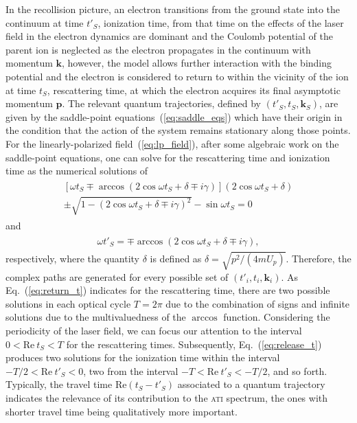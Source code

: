 In the recollision picture, an electron transitions from the ground
state into the continuum at time $t'_{S}$, ionization time, from that
time on the effects of the laser field in the electron dynamics are
dominant and the Coulomb potential of the parent ion is neglected as
the electron propagates in the continuum with momentum $\mathbf{k}$,
however, the model allows further interaction with the binding
potential and the electron is considered to return to within the
vicinity of the ion at time $t_{S}$, rescattering time, at which the
electron acquires its final asymptotic momentum $\mathbf{p}$. The
relevant quantum trajectories, defined by $(t'_{S}, t_{S},
\mathbf{k}_{S})$, are given by the saddle-point
equations~(\ref{eq:saddle_eqs}) which have their origin in the
condition that the action of the system remains stationary along those
points. For the linearly-polarized field~(\ref{eq:lp_field}), after
some algebraic work on the saddle-point equations, one can solve for
the rescattering time and ionization time as the numerical solutions
of~\cite{KopoldOptComm2000}
%
\begin{eqnarray}
  \label{eq:return_t}
  \begin{split}
    [\omega t_{S} \mp \arccos(2\cos\omega t_{S} + \delta \mp i\gamma)]
    (2\cos\omega t_{S} + \delta) \\
    \pm \sqrt{1 - (2\cos\omega t_{S} + \delta \mp i\gamma)^{2}} 
    - \sin\omega t_{S} = 0
  \end{split}
\end{eqnarray}
%
and
%
\begin{eqnarray}
  \label{eq:release_t}
  \begin{split}
    \omega t'_{S} = \mp \arccos(2\cos\omega t_{S} + \delta \mp i\gamma),
  \end{split}
\end{eqnarray}  
%
respectively, where the quantity $\delta$ is defined as $\delta =
\sqrt{p^{2} / (4mU_{p})}$. Therefore, the complex paths are generated
for every possible set of $(t'_{i}, t_{i}, \mathbf{k}_{i})$. As
Eq.~(\ref{eq:return_t}) indicates for the rescattering time, there are
two possible solutions in each optical cycle $T = 2\pi$ due to the
combination of signs and infinite solutions due to the multivaluedness
of the $\arccos$ function. Considering the periodicity of the laser
field, we can focus our attention to the interval $0 <
\mathrm{Re}\ t_{S} < T$ for the rescattering times. Subsequently,
Eq.~(\ref{eq:release_t}) produces two solutions for the ionization
time within the interval $-T/2 < \mathrm{Re}\ t'_{S} < 0$, two from
the interval $-T < \mathrm{Re}\ t'_{S} < -T/2$, and so
forth. Typically, the travel time $\mathrm{Re}(t_{S} - t'_{S})$
associated to a quantum trajectory indicates the relevance of its
contribution to the \textsc{ati} spectrum, the ones with shorter
travel time being qualitatively more important.

